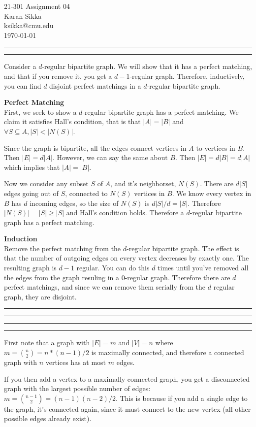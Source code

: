 \documentclass[11pt,letterpaper]{article}
\makeatletter
\newcommand{\question}[1] {\vspace{.25in} \hrule\vspace{0.5em}
\noindent{\bf #1} \vspace{0.5em}
\hrule \vspace{.10in}}
\newcommand{\myname}{Karan Sikka}
\newcommand{\myandrew}{ksikka@cmu.edu}
\newcommand{\myhwnum}{04}
\makeatother
\begin{document}
\medskip

\thispagestyle{plain}
\begin{center}                  %
{\Large 21-301 Assignment \myhwnum} \\
\myname \\
\myandrew \\
\today
\end{center}


\question{1}
Consider a $d$-regular bipartite graph. We will show that it has a perfect matching, and that if you remove it, you get a $d-1$-regular graph. Therefore, inductively, you can find $d$ disjoint perfect matchings in a $d$-regular bipartite graph.

\textbf{Perfect Matching}\\
First, we seek to show a $d$-regular bipartite graph has a perfect matching.
We claim it satisfies Hall's condition, that is that $|A| = |B|$ and
$\forall S \subseteq A , |S| < |N(S)|$.

Since the graph is bipartite, all the edges connect vertices in $A$ to vertices in $B$.
Then $|E| = d|A|$. However, we can say the same about $B$.
Then $|E| = d|B| = d|A|$ which implies that $|A| = |B|$.

Now we consider any subset $S$ of $A$, and it's neighborset, $N(S)$.
There are $d|S|$ edges going out of $S$, connected to $N(S)$ vertices in $B$.
We know every vertex in $B$ has $d$ incoming edges, so the size of $N(S)$ is $d|S|/d = |S|$.
Therefore $|N(S)| = |S| \geq |S|$ and Hall's condition holds. Therefore a $d$-regular bipartite graph has a perfect matching.

\textbf{Induction}\\
Remove the perfect matching from the $d$-regular bipartite graph. The effect is that the number of outgoing edges on every vertex decreases by exactly one.
The resulting graph is $d-1$ regular. You can do this $d$ times until you've removed all the edges from the graph resuling in a 0-regular graph.
Therefore there are $d$ perfect matchings, and since we can remove them serially from the $d$ regular graph, they are disjoint.

\question{2}

\question{3}
First note that a graph with $|E| = m$ and $|V| = n$ where $m = {n \choose 2} = n*(n - 1)/2$ is maximally connected, and therefore a connected graph with $n$ vertices has at most $m$ edges.

If you then add a vertex to a maximally connected graph, you get a disconnected graph with the largest possible number of edges: $m = {n-1 \choose 2} = (n-1)(n-2)/2$.
This is because if you add a single edge to the graph, it's connected again, since it must connect to the new vertex (all other possible edges already exist).
\end{document}
